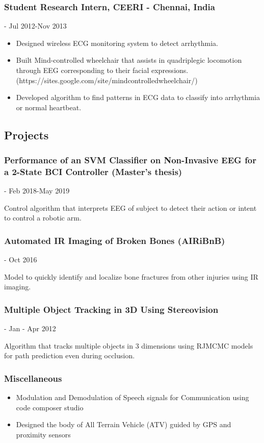 \documentclass{article}
\begin{document}
\subsubsection{Student Research Intern, CEERI - Chennai, India} - Jul 2012-Nov 2013
\begin{itemize}
    \item Designed wireless ECG monitoring system to detect arrhythmia.
    \item Built Mind-controlled wheelchair that assists in quadriplegic locomotion through EEG corresponding to their facial expressions.
    (https://sites.google.com/site/mindcontrolledwheelchair/)
    \item Developed algorithm to find patterns in ECG data to classify into arrhythmia or normal heartbeat.
\end{itemize}


\subsection{Projects}
\subsubsection{Performance of an SVM Classifier on Non-Invasive EEG for a 2-State BCI Controller (Master's thesis)} - Feb 2018-May 2019

Control algorithm that interprets EEG of subject to detect their action or intent to control a robotic arm.

 \subsubsection{Automated IR Imaging of Broken Bones (AIRiBnB)} - Oct 2016
 
Model to quickly identify and localize bone fractures from other injuries using IR imaging.
    
\subsubsection{Multiple Object Tracking in 3D Using Stereovision} - Jan - Apr 2012

Algorithm that tracks multiple objects in 3 dimensions using RJMCMC models for path prediction even during occlusion.
    
\subsubsection{Miscellaneous}
\begin{itemize}
    \item Modulation and Demodulation of Speech signals for Communication using code composer studio 
    \item Designed the body of All Terrain Vehicle (ATV) guided by GPS and proximity sensors  
\end{itemize}
\end{document}
